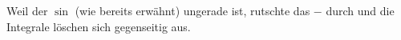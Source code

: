 \begin{solution}
\begin{enumerate}[label = \arabic*.]
    Weil der $\sin$ (wie bereits erwähnt) ungerade ist, rutschte das $-$ durch und die Integrale löschen sich gegenseitig aus.

\end{enumerate}

\end{solution}

